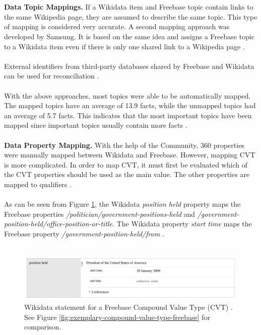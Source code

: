 ﻿\documentclass[11pt,titlepage,oneside,openany]{book}
\begin{document}
\\
\\
\textbf{Data Topic Mappings. } If a Wikidata item and Freebase topic contain links to the same Wikipedia page, they are assumed to describe the same topic. This type of mapping is considered very accurate. A second mapping approach was developed by Samsung. It is based on the same idea and assigns a Freebase topic to a Wikidata item even if there is only one shared link to a Wikipedia page \cite{Tanon2016FromFT}. 
\\
\\
External identifiers from third-party databases shared by Freebase and Wikidata can be used for reconciliation \cite{Tanon2016FromFT}. 
\\
\\
With the above approaches, most topics were able to be automatically mapped. The mapped topics have an average of 13.9 facts, while the unmapped topics had an average of 5.7 facts. This indicates that the most important topics have been mapped since important topics usually contain more facts \cite{Tanon2016FromFT}.
\\
\\
\textbf{Data Property Mapping. } With the help of the Community, 360 properties were manually mapped between Wikidata and Freebase. However, mapping CVT is more complicated. In order to map CVT, it must first be evaluated which of the CVT properties should be used as the main value. The other properties are mapped to qualifiers \cite{Tanon2016FromFT}. 
\\
\\
As can be seen from Figure \ref{fig:wikidata-statement-freebase-compound-value-type}, the Wikidata \textit{position held} property maps the Freebase properties \textit{/politician/government-positions-held} and \textit{/government-position-held/office-position-or-title}. The Wikidata property \textit{start time} maps the Freebase property \textit{/government-position-held/from} \cite{Tanon2016FromFT}.
\\
\\

\begin{figure}
	\begin{center}
	\includegraphics[width=13cm]{./figures/wikidata-statement-freebase-compound-value-type.png}
	\caption[Wikidata statement for a Freebase Compound Value Type (CVT)]{Wikidata statement for a Freebase Compound Value Type (CVT) \cite{Tanon2016FromFT}. See Figure \ref{fig:exemplary-compound-value-type-freebase} for comparison.}
	\label{fig:wikidata-statement-freebase-compound-value-type}
	\end{center}
\end{figure}
\end{document}

